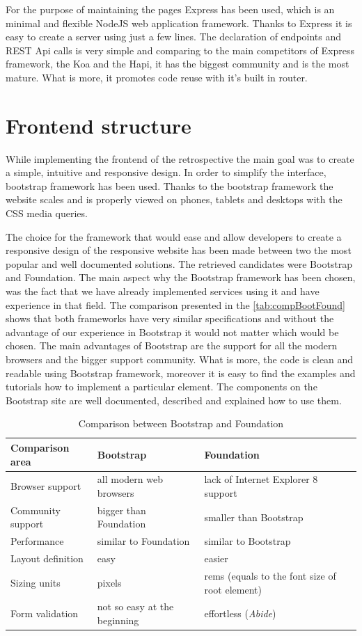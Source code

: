 For the purpose of maintaining the pages Express has been used, which is an minimal and flexible NodeJS web application framework. Thanks to Express it is easy to create a server using just a few lines. The declaration of endpoints and REST Api calls is very simple and comparing to the main competitors of Express framework, the Koa and the Hapi, it has the biggest community and is the most mature. What is more, it promotes code reuse with it's built in router.

\section{Frontend structure}

While implementing the frontend of the retrospective the main goal was to create a simple, intuitive and responsive design. In order to simplify the interface, bootstrap framework has been used. Thanks to the bootstrap framework the website scales and is properly viewed on phones, tablets and desktops with the CSS media queries. 

The choice for the framework that would ease and allow developers to create a responsive design of the responsive website has been made between two the most popular and well documented solutions. The retrieved candidates were Bootstrap and Foundation. The main aspect why the Bootstrap framework has been chosen, was the fact that we have already implemented services using it and have experience in that field. The comparison presented in the \autoref{tab:compBootFound} shows that both frameworks have very similar specifications and without the advantage of our experience in Bootstrap it would not matter which would be chosen. The main advantages of Bootstrap are the support for all the modern browsers and the bigger support community. What is more, the code is clean and readable using Bootstrap framework, moreover it is easy to find the examples and tutorials how to implement a particular element. The components on the Bootstrap site are well documented, described and explained how to use them.

\begin{table}[ht!]
\caption{Comparison between Bootstrap and Foundation}
\label{tab:compBootFound}
\begin{tabularx}{\textwidth}{|X|X|X|}
\hline
\textbf{Comparison area} & \textbf{Bootstrap} & \textbf{Foundation}  \\ \hline
Browser support & all modern web browsers & lack of Internet Explorer 8 support \\ \hline
Community support & bigger than Foundation & smaller than Bootstrap \\ \hline
Performance & similar to Foundation & similar to Bootstrap \\ \hline
Layout definition & easy & easier \\ \hline
Sizing units & pixels & rems (equals to the font size of root element)\\ \hline
Form validation & not so easy at the beginning & effortless (\textit{Abide}) \\ \hline
\end{tabularx}
\end{table}

